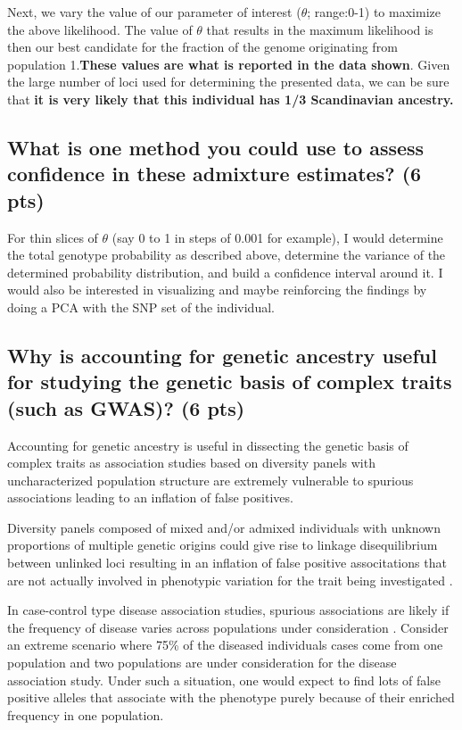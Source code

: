 \documentclass[]{article}
\begin{document}
Next, we vary the value of our parameter of interest ($\theta$;
range:0-1) to maximize the above likelihood. The value of $\theta$ that
results in the maximum likelihood is then our best candidate for the
fraction of the genome originating from population
1.\textbf{These values are what is reported in the data shown}. Given
the large number of loci used for determining the presented data, we can
be sure that \textbf{it is very likely that this individual has 1/3
Scandinavian ancestry.}

\subsection{What is one method you could use to assess confidence in
these admixture estimates? (6
pts)}\label{what-is-one-method-you-could-use-to-assess-confidence-in-these-admixture-estimates-6-pts}

For thin slices of $\theta$ (say 0 to 1 in steps of 0.001 for example),
I would determine the total genotype probability as described above,
determine the variance of the determined probability distribution, and
build a confidence interval around it. I would also be interested in
visualizing and maybe reinforcing the findings by doing a PCA with the
SNP set of the individual.
\pagebreak

\subsection{Why is accounting for genetic ancestry useful for studying
the genetic basis of complex traits (such as GWAS)? (6
pts)}\label{why-is-accounting-for-genetic-ancestry-useful-for-studying-the-genetic-basis-of-complex-traits-such-as-gwas-6-pts}

Accounting for genetic ancestry is useful in dissecting the genetic
basis of complex traits as association studies based on diversity panels
with uncharacterized population structure are extremely vulnerable to
spurious associations leading to an inflation of false positives.

Diversity panels composed of mixed and/or admixed individuals with
unknown proportions of multiple genetic origins could give rise to
linkage disequilibrium between unlinked loci resulting in an inflation
of false positive associtations that are not actually involved in
phenotypic variation for the trait being investigated \cite{mezmouk}.

In case-control type disease association studies, spurious associations
are likely if the frequency of disease varies across populations under
consideration \cite{pritchard}. Consider an extreme scenario where 75\%
of the diseased individuals cases come from one population and two
populations are under consideration for the disease association study.
Under such a situation, one would expect to find lots of false positive
alleles that associate with the phenotype purely because of their
enriched frequency in one population. 
\end{document}
